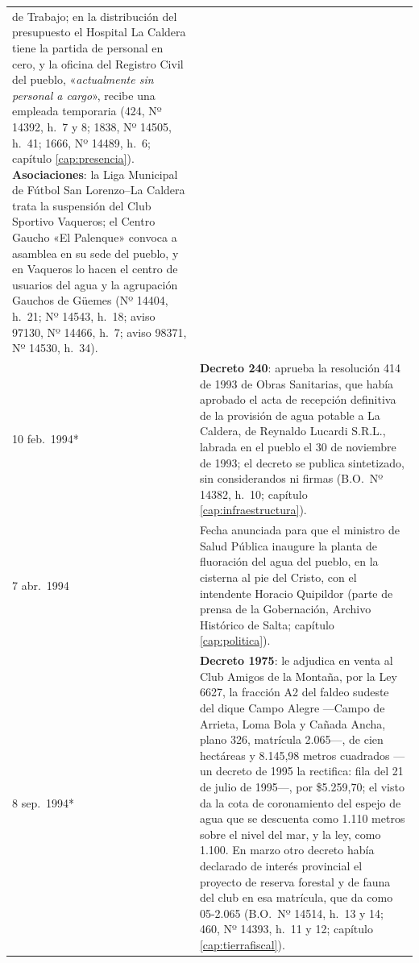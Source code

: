 \begin{longtable}{@{}p{2.7cm}p{10.3cm}@{}}
de Trabajo; en la distribución del presupuesto el Hospital La Caldera tiene la partida de personal en cero, y la oficina del Registro Civil del pueblo, «\textit{actualmente sin personal a cargo}», recibe una empleada temporaria (424, Nº 14392, h.\ 7 y 8; 1838, Nº 14505, h.\ 41; 1666, Nº 14489, h.\ 6; capítulo \ref{cap:presencia}). \textbf{Asociaciones}: la Liga Municipal de Fútbol San Lorenzo--La Caldera trata la suspensión del Club Sportivo Vaqueros; el Centro Gaucho «El Palenque» convoca a asamblea en su sede del pueblo, y en Vaqueros lo hacen el centro de usuarios del agua y la agrupación Gauchos de Güemes (Nº 14404, h.\ 21; Nº 14543, h.\ 18; aviso 97130, Nº 14466, h.\ 7; aviso 98371, Nº 14530, h.\ 34). \\
10 feb.\ 1994* & \textbf{Decreto 240}: aprueba la resolución 414 de 1993 de Obras Sanitarias, que había aprobado el acta de recepción definitiva de la provisión de agua potable a La Caldera, de Reynaldo Lucardi S.R.L., labrada en el pueblo el 30 de noviembre de 1993; el decreto se publica sintetizado, sin considerandos ni firmas (B.O.\ Nº 14382, h.\ 10; capítulo \ref{cap:infraestructura}). \\
7 abr.\ 1994 & Fecha anunciada para que el ministro de Salud Pública inaugure la planta de fluoración del agua del pueblo, en la cisterna al pie del Cristo, con el intendente Horacio Quipildor (parte de prensa de la Gobernación, Archivo Histórico de Salta; capítulo \ref{cap:politica}). \\
8 sep.\ 1994* & \textbf{Decreto 1975}: le adjudica en venta al Club Amigos de la Montaña, por la Ley 6627, la fracción A2 del faldeo sudeste del dique Campo Alegre ---Campo de Arrieta, Loma Bola y Cañada Ancha, plano 326, matrícula 2.065---, de cien hectáreas y 8.145,98 metros cuadrados ---un decreto de 1995 la rectifica: fila del 21 de julio de 1995---, por \$5.259,70; el visto da la cota de coronamiento del espejo de agua que se descuenta como 1.110 metros sobre el nivel del mar, y la ley, como 1.100. En marzo otro decreto había declarado de interés provincial el proyecto de reserva forestal y de fauna del club en esa matrícula, que da como 05-2.065 (B.O.\ Nº 14514, h.\ 13 y 14; 460, Nº 14393, h.\ 11 y 12; capítulo \ref{cap:tierrafiscal}). \\

\end{longtable}
